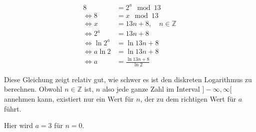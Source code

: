 \documentclass[12pt,twocolumn]{report}
\begin{document}
\begin{align}
    8&=2^a\mod 13 \\
    \Leftrightarrow 8&=x\mod 13 \\
    \Leftrightarrow x&=13n+8,\quad n\in\mathbb{Z} \\
    \Leftrightarrow 2^a&=13n+8 \\
    \Leftrightarrow \ln{2^a}&=\ln{13n+8} \\
    \Leftrightarrow a\ln{2}&=\ln{13n+8} \\
    \Leftrightarrow a&=\frac{\ln{13n+8}}{\ln{2}}
\end{align}

\begin{flushleft}
Diese Gleichung zeigt relativ gut, wie schwer es ist den diskreten Logarithmus
zu berechnen. Obwohl $n\in\mathbb{Z}$ ist, $n$ also jede ganze Zahl im Interval $]-\infty,\infty[$
annehmen kann, existiert nur ein Wert für $n$, der zu dem richtigen Wert für $a$ führt.

Hier wird $a=3$ für $n=0$.
\end{flushleft}
\end{document}
